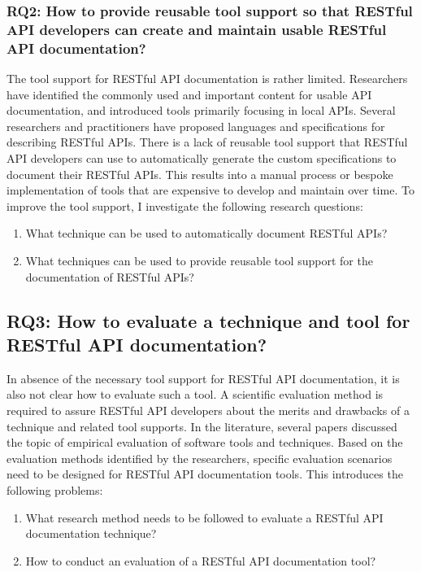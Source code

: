 \documentclass[11pt,oneside]{book}
\begin{document}
\subsubsection{RQ2: How to provide reusable tool support so that RESTful API developers can create and maintain usable RESTful API documentation?
} %

The tool support for RESTful API documentation is rather limited. Researchers have identified the commonly used and important content for usable API documentation, and introduced tools primarily focusing in local APIs. Several researchers and practitioners have proposed languages and specifications for describing RESTful APIs. There is a lack of reusable tool support that RESTful API developers can use to automatically generate the custom specifications to document their RESTful APIs. This results into a manual process or bespoke implementation of tools that are expensive to develop and maintain over time. To improve the tool support, I investigate the following research questions:

\begin{enumerate}
  \item What technique can be used to automatically document RESTful APIs?
  \item What techniques can be used to provide reusable tool support for the documentation of RESTful APIs?
\end{enumerate}

\subsection{RQ3: How to evaluate a technique and tool for RESTful API documentation?}

In absence of the necessary tool support for RESTful API documentation, it is also not clear how to evaluate such a tool. A scientific evaluation method is required to assure RESTful API developers about the merits and drawbacks of a technique and related tool supports. In the literature, several papers discussed the topic of empirical evaluation of software tools and techniques. Based on the evaluation methods identified by the researchers, specific evaluation scenarios need to be designed for RESTful API documentation tools. This introduces the following problems:

\begin{enumerate}
\item What research method needs to be followed to evaluate a RESTful API
documentation technique?
\item How to conduct an evaluation of a RESTful API documentation tool?
\end{enumerate}
\end{document}
